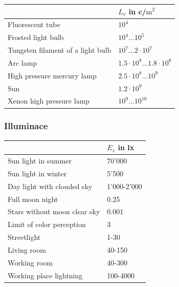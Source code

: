 \begin{table}[ht]
	\centering
	\begin{tabular}{ |p{13cm} p{3cm}|  }
		\hline
		& $L_v$ in c/$\text{m}^2$\\
		
		
		\hline
		Fluorescent tube					& $10^4$\\
		Frosted light bulb					& $10^4...10^5$\\
		Tungsten filament of a light bulb	& $10^7...2\cdot 10^7$\\
		Arc lamp							& $1.5\cdot10^8...1.8\cdot10^8$\\
		High pressure mercury lamp			& $2.5\cdot10^8...10^9$\\
		Sun									& $1.2\cdot10^9$\\
		Xenon high pressure lamp			& $10^9...10^10$\\
		
		\hline
	\end{tabular}
\end{table}



\subsubsection{Illuminace }
\begin{table}[ht]
	\centering
	\begin{tabular}{ |p{12cm} p{3cm}|  }
		\hline
		& $E_v$ in lx\\
		
		
		\hline
		Sun light in summer					& 70'000\\
		Sun light in winter					& 5'500\\
		Day light with clouded sky			& 1'000-2'000\\
		Full moon night						& 0.25\\
		Stars without moon clear sky		& 0.001\\
		Limit of color perception			& 3\\
		Streetlight							& 1-30\\
		Living room							& 40-150\\
		Working room						& 40-300\\
		Working place lightning				& 100-4000\\
		
		\hline
	\end{tabular}
\end{table}




